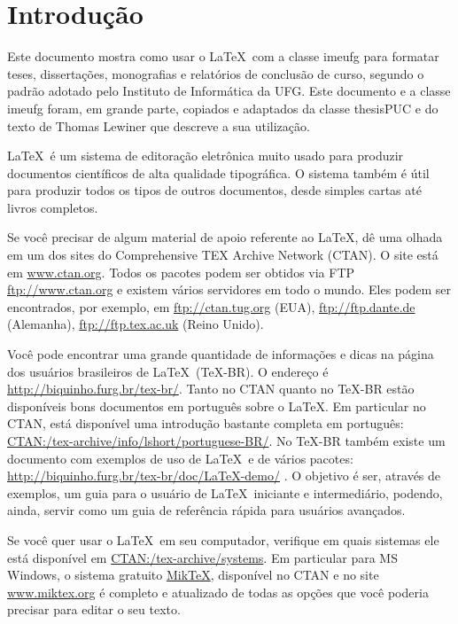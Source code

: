 
\chapter{Introdução}
\label{cap:intro}

Este documento mostra como usar o \LaTeX\ com a classe \textsf{imeufg} para formatar teses, dissertações, monografias e relatórios de conclusão de curso, segundo o padrão adotado pelo Instituto de Informática da UFG. Este documento e a classe \textsf{imeufg} foram, em grande parte, copiados e adaptados da classe \textsf{thesisPUC} e do texto de Thomas Lewiner \cite{Lew2002} que descreve a sua utilização.

 \LaTeX\ é um sistema de editoração eletrônica muito usado para produzir documentos científicos de alta qualidade tipográfica. O sistema também é útil para produzir todos os tipos de outros documentos, desde simples cartas até livros completos.

Se você precisar de algum material de apoio referente ao \LaTeX, dê uma olhada em um dos sites do Comprehensive TEX Archive Network (CTAN). O site está em \href{http://www.ctan.org/}{www.ctan.org}. Todos os pacotes podem ser obtidos via \textsf{FTP} \href{ftp://www.ctan.org/}{ftp://www.ctan.org} e existem vários servidores em todo o mundo. Eles podem ser encontrados, por exemplo, em \href{ftp://ctan.tug.org/}{ftp://ctan.tug.org} (EUA), \href{ftp://ftp.dante.de/}{ftp://ftp.dante.de} (Alemanha), \href{ftp://ftp.tex.ac.uk/}{ftp://ftp.tex.ac.uk} (Reino Unido).

Você pode encontrar uma grande quantidade de informações e dicas na página dos usuários brasileiros de \LaTeX\ (\TeX-BR). O endereço é \href{http://biquinho.furg.br/tex-br/}{http://biquinho.furg.br/tex-br/}.
Tanto no CTAN quanto no \TeX-BR estão disponíveis bons documentos em português sobre o \LaTeX. Em particular no CTAN, está disponível uma introdução bastante completa em português: \href{http://www.ctan.org/tex-archive/info/lshort/portuguese-BR/lshortBR.pdf}{CTAN:/tex-archive/info/lshort/portuguese-BR/}. No \TeX-BR também existe um documento com exemplos de uso de \LaTeX\ e de vários pacotes: \href{http://biquinho.furg.br/tex-br/doc/LaTeX-demo/}{http://biquinho.furg.br/tex-br/doc/LaTeX-demo/} . O objetivo é ser, através de exemplos, um guia para o usuário de \LaTeX\ iniciante e intermediário, podendo, ainda, servir como um guia de referência rápida para usuários avançados.

Se você quer usar o \LaTeX\ em seu computador, verifique em quais sistemas ele está disponível em \href{http://www.ctan.org/tex-archive/systems/}{CTAN:/tex-archive/systems}. Em particular para \textsf{MS Windows}, o sistema gratuito \href{http://www.miktex.org/}{MikTeX}, disponível no CTAN e no site \href{http://www.miktex.org/}{www.miktex.org} é completo e atualizado de todas as opções  que você poderia precisar para editar o seu texto.

